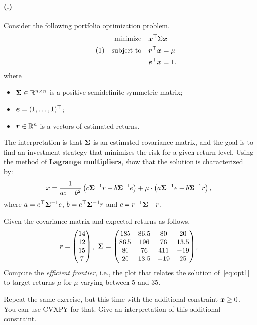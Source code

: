 \documentclass{article}
\newcounter{problemSheetNumber}
\newcounter{problems}
\renewcommand{\problem}{\paragraph{(\theproblemSheetNumber.\theproblems)}\addtocounter{problems}{1}}
\begin{document}
\problem Consider the following portfolio optimization problem.
\begin{align}\label{eq:opt1}\tag{1}
\begin{split}
 \text{minimize}\quad & \bm{x}^{\top}\Sigma\bm{x}\\
 \quad\text{subject to}\quad & \bm{r}^{\top}\bm{x}=\mu\\
 & \bm{e}^{\top}\bm{x}=1.
 \end{split}
\end{align}
where
\begin{itemize}
 \item $\bm{\Sigma}\in \mathbb{R}^{n\times n}$ is a positive semidefinite symmetric matrix;
 \item $\bm{e} = (1,\dots,1)^{\top}$;
 \item $\bm{r}\in \mathbb{R}^n$ is a vectors of estimated returns.
\end{itemize}

The interpretation is that $\bm{\Sigma}$ is an estimated covariance matrix, and the goal is to find an investment strategy that minimizes the risk for a given return level.
Using the method of \textbf{Lagrange multipliers}, show that the solution is characterized by:
\begin{equation*}
 x = \frac{1}{ac-b^2} \left(c\bm{\Sigma}^{-1}r-b\bm{\Sigma}^{-1}e\right)+\mu\cdot \left(a\bm{\Sigma}^{-1}e-b\bm{\Sigma}^{-1}r\right),
\end{equation*}
where $a=e^{\top}\bm{\Sigma}^{-1}e$, $b=e^{\top}\bm{\Sigma}^{-1}r$ and $c=r^{-1}\bm{\Sigma}^{-1}r$.

Given the covariance matrix and expected returns as follows,
\begin{equation*}
 \vct{r} = \begin{pmatrix}
            14\\12\\15\\7
           \end{pmatrix}, \ 
\mtx{\Sigma} = \begin{pmatrix}
                185 & 86.5 & 80 & 20\\
                86.5 & 196 & 76 & 13.5\\
                80 & 76 & 411 & -19\\
                20 & 13.5 & -19 & 25
               \end{pmatrix},
\end{equation*}
Compute the {\em efficient frontier}, i.e., the plot that relates the solution of~\eqref{eq:opt1} to target returns $\mu$ for $\mu$ varying between $5$ and $35$.

Repeat the same exercise, but this time with the additional constraint $\bm{x}\geq 0$. You can use CVXPY for that. Give an interpretation of this additional constraint.
\end{document}
